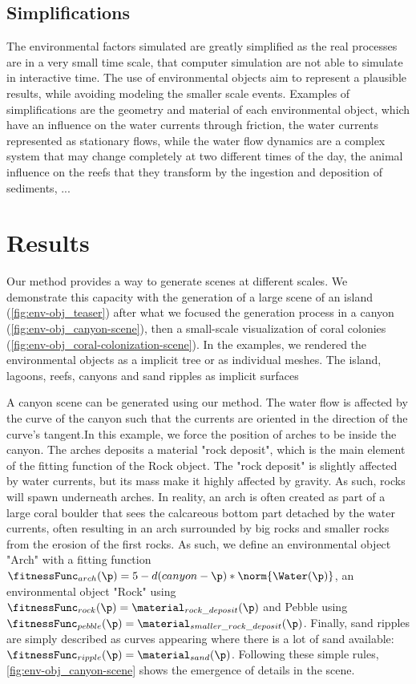 \subsection{Simplifications}
\label{sec:env-obj_simplifications}
The environmental factors simulated are greatly simplified as the real processes are in a very small time scale, that computer simulation are not able to simulate in interactive time. The use of environmental objects aim to represent a plausible results, while avoiding modeling the smaller scale events. Examples of simplifications are the geometry and material of each environmental object, which have an influence on the water currents through friction, the water currents represented as stationary flows, while the water flow dynamics are a complex system that may change completely at two different times of the day, the animal influence on the reefs that they transform by the ingestion and deposition of sediments, ...


\section{Results}
\label{sec:env-obj_results}
Our method provides a way to generate scenes at different scales. We demonstrate this capacity with the generation of a large scene of an island (\cref{fig:env-obj_teaser}) after what we focused the generation process in a canyon (\cref{fig:env-obj_canyon-scene}), then a small-scale visualization of coral colonies (\cref{fig:env-obj_coral-colonization-scene}).
In the examples, we rendered the environmental objects as a implicit tree or as individual meshes. The island, lagoons, reefs, canyons and sand ripples as implicit surfaces

A canyon scene can be generated using our method. The water flow is affected by the curve of the canyon such that the currents are oriented in the direction of the curve's tangent.In this example, we force the position of arches to be inside the canyon. The arches deposits a material "rock deposit", which is the main element of the fitting function of the Rock object. The "rock deposit" is slightly affected by water currents, but its mass make it highly affected by gravity. As such, rocks will spawn underneath arches. In reality, an arch is often created as part of a large coral boulder that sees the calcareous bottom part detached by the water currents, often resulting in an arch surrounded by big rocks and smaller rocks from the erosion of the first rocks.
As such, we define an environmental object "Arch" with a fitting function $\fitnessFunc_{arch}(\p) = 5 - d(canyon - \p) * \norm{\Water(\p)}$, an environmental object "Rock" using $\fitnessFunc_{rock}(\p) = \material_{rock\_deposit}(\p)$ and Pebble using $\fitnessFunc_{pebble}(\p) = \material_{smaller\_rock\_deposit}(\p)$. Finally, sand ripples are simply described as curves appearing where there is a lot of sand available: $\fitnessFunc_{ripple}(\p) = \material_{sand}(\p)$.
Following these simple rules, \cref{fig:env-obj_canyon-scene} shows the emergence of details in the scene. 

